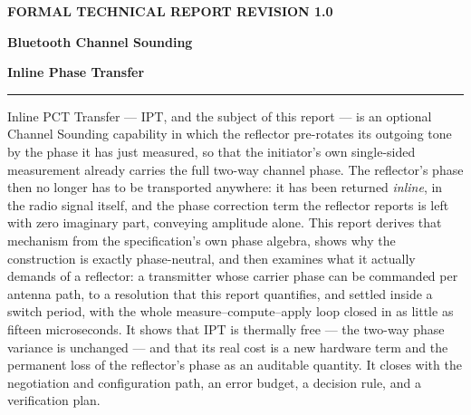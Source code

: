 \documentclass[11pt,a4paper]{article}
\newcommand{\IPT}{\ensuremath{\mathrm{IPT}}}
\begin{document}
\thispagestyle{empty}
\vspace*{18mm}
{\color{accent}\small\bfseries FORMAL TECHNICAL REPORT \hfill REVISION 1.0}
\vspace{26mm}

{\raggedright\color{navy}\Huge\bfseries Bluetooth Channel Sounding\par}
\vspace{5mm}
{\raggedright\color{navy}\huge\bfseries Inline Phase Transfer\par}

\vspace{7mm}

\vspace{12mm}
\noindent\rule{\textwidth}{1pt}
\vspace{4mm}

\noindent
Inline PCT Transfer --- \IPT, and the subject of this report --- is an optional Channel Sounding
capability in which the reflector pre-rotates its outgoing tone by the phase it has just measured,
so that the initiator's own single-sided measurement already carries the full two-way channel phase.
The reflector's phase then no longer has to be transported anywhere: it has been returned
\emph{inline}, in the radio signal itself, and the phase correction term the reflector reports is
left with zero imaginary part, conveying amplitude alone. This report derives that mechanism from
the specification's own phase algebra, shows why the construction is exactly phase-neutral, and then
examines what it actually demands of a reflector: a transmitter whose carrier phase can be commanded
per antenna path, to a resolution that this report quantifies, and settled inside a switch period,
with the whole measure--compute--apply loop closed in as little as fifteen microseconds. It shows
that \IPT{} is thermally free --- the two-way phase variance is unchanged --- and that its real cost
is a new hardware term and the permanent loss of the reflector's phase as an auditable quantity. It
closes with the negotiation and configuration path, an error budget, a decision rule, and a
verification plan.
\end{document}
